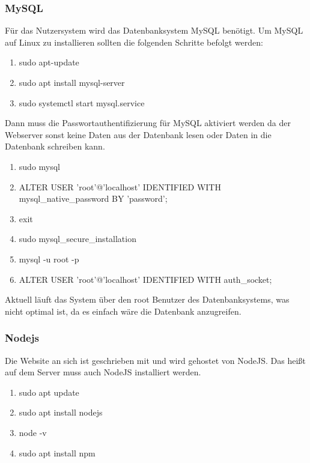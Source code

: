 \subsubsection{MySQL}
Für das Nutzersystem wird das Datenbanksystem MySQL benötigt. Um MySQL auf Linux zu installieren sollten die folgenden Schritte befolgt werden:
\begin{enumerate}
	\item sudo apt-update
	\item sudo apt install mysql-server
	\item sudo systemctl start mysql.service
\end{enumerate}
Dann muss die Passwortauthentifizierung für MySQL aktiviert werden da der Webserver sonst keine Daten aus der Datenbank lesen oder Daten in die Datenbank schreiben kann.
\begin{enumerate}
	\item sudo mysql \newpage
	\item ALTER USER 'root'@'localhost' IDENTIFIED WITH mysql\_native\_password BY 'password';
	\item exit
	\item sudo mysql\_secure\_installation
	\item mysql -u root -p
	\item ALTER USER 'root'@'localhost' IDENTIFIED WITH auth\_socket;
\end{enumerate}
Aktuell läuft das System über den root Benutzer des Datenbanksystems, was nicht optimal ist, da es einfach wäre die Datenbank anzugreifen.
\cite{MySQLinstall}

\subsubsection{Nodejs}
Die Website an sich ist geschrieben mit und wird gehostet von NodeJS. Das heißt auf dem Server muss auch NodeJS installiert werden. \cite{Nodejsinstall}
\begin{enumerate}
	\item sudo apt update
	\item sudo apt install nodejs
	\item node -v
	\item sudo apt install npm
\end{enumerate}


